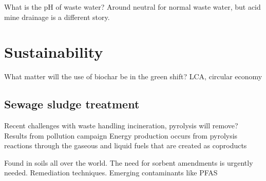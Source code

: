 What is the pH of waste water? Around neutral for normal waste water, but acid mine drainage is a different story. 


\section{Sustainability}
What matter will the use of biochar be in the green shift? LCA, circular economy

\subsection{Sewage sludge treatment}
Recent challenges with waste handling
incineration, pyrolysis will remove? Results from pollution campaign 
\citep{Morin2017flameWaste}
Energy production occurs from pyrolysis reactions through the gaseous and liquid fuels that are created as coproducts

Found in soils all over the world. The need for sorbent amendments is urgently needed. Remediation techniques. Emerging contaminants like PFAS

